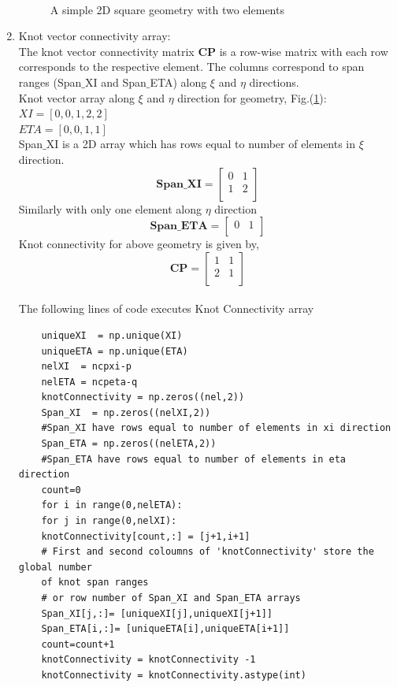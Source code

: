 \documentclass[11pt]{article}
\begin{document}
\begin{enumerate}[leftmargin=*]
\begin{figure}[H]
\begin{center}
			\caption{\\A simple 2D square geometry with two elements}\label{Element}
		\end{center}	
	\end{figure}
	\item Knot vector connectivity array: \\
	The knot vector connectivity matrix \textbf{CP} is a row-wise matrix with each row corresponds to the respective element. The columns correspond to span ranges (Span$\_$XI and Span$\_$ETA) along $\xi$ and $\eta$ directions. \\
	Knot vector array along $\xi$ and $\eta$ direction for geometry, Fig.(\ref{Element}): \\
	$XI  = [ 0, 0, 1, 2, 2 ]$ \\
	$ETA = [ 0, 0, 1, 1 ]$ \\
	Span$\_$XI is a 2D array which has rows equal to number of elements in $\xi$ direction.
	\begin{equation} \label{SpanXI}
	\textbf{Span\_XI} =
	\begin{bmatrix}
	0 & 1  \\
	1 & 2  \\
	\end{bmatrix}
	\end{equation}
	Similarly with only one element along $\eta$ direction
	\begin{equation} \label{SpanETA}
	\textbf{Span\_ETA} =
	\begin{bmatrix}
	0 & 1  \\
	\end{bmatrix}
	\end{equation}
	Knot connectivity for above geometry is given by,
	\begin{equation} \label{CP}
	\textbf{CP} =
	\begin{bmatrix}
	1 & 1  \\
	2 & 1  \\
	\end{bmatrix}
	\end{equation}
\\
	The following lines of code executes Knot Connectivity array
	\begin{verbatim}
	uniqueXI  = np.unique(XI)
	uniqueETA = np.unique(ETA)
	nelXI  = ncpxi-p
	nelETA = ncpeta-q
	knotConnectivity = np.zeros((nel,2)) 
	Span_XI  = np.zeros((nelXI,2))
	#Span_XI have rows equal to number of elements in xi direction
	Span_ETA = np.zeros((nelETA,2))
	#Span_ETA have rows equal to number of elements in eta direction
	count=0
	for i in range(0,nelETA):
	for j in range(0,nelXI):
	knotConnectivity[count,:] = [j+1,i+1] 
	# First and second coloumns of 'knotConnectivity' store the global number 
	of knot span ranges
	# or row number of Span_XI and Span_ETA arrays
	Span_XI[j,:]= [uniqueXI[j],uniqueXI[j+1]]
	Span_ETA[i,:]= [uniqueETA[i],uniqueETA[i+1]]
	count=count+1
	knotConnectivity = knotConnectivity -1
	knotConnectivity = knotConnectivity.astype(int)
	\end{verbatim} 
	

\end{enumerate}
\end{document}
